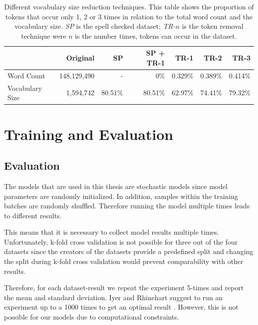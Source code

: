 \begin{table}[]
	\centering
	\begin{tabular}{lrrrrrr}
			\toprule
							& Original  	& SP & SP + TR-1 & TR-1 & TR-2 & TR-3 \\
			\midrule
			Word Count      &148,129,490 	& -              & 0\%           & 0.329\%         & 0.389\%         & 0.414\%            \\
			Vocabulary Size & 1,594,742   	& 80.51\%        & 80.51\% 		 & 62.97\%         & 74.41\%         & 79.32\%      \\  
			\bottomrule 	
	\end{tabular}

	\caption{Different vocabulary size reduction techniques. This table shows the proportion of tokens that occur only 1, 2 or 3 times in relation to the total word count and the vocabulary size. \textit{SP} is the spell checked dataset; \textit{TR-}$n$ is the token removal technique were $n$ is the number times, tokens can occur in the dataset.}
	\label{tab:05_amazonVocabSize}
\end{table}

\section{Training and Evaluation}
\label{sec:05_TrainingAndEvaluation}

\subsection{Evaluation}

The models that are used in this thesis are stochastic models since model parameters are randomly initialized. In addition, samples within the training batches are randomly shuffled. Therefore running the model multiple times leads to different results.
\medskip

This means that it is necessary to collect model results multiple times. Unfortunately, k-fold cross validation is not possible for three out of the four datasets since the creators of the datasets provide a predefined split and changing the split during k-fold cross validation would prevent comparability with other results.

Therefore, for each dataset-result we repeat the experiment 5-times and report the mean and standard deviation. Iyer and Rhinehart suggest to run an experiment up to a 1000 times to get an optimal result \cite{Iyer1999}. However, this is not possible for our models due to computational constraints.
\medskip

